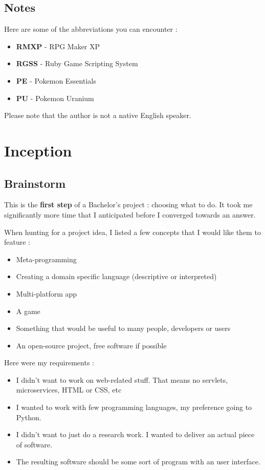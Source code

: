 \documentclass[11pt]{article}
\begin{document}
\subsection{Notes}

Here are some of the abbreviations you can encounter :
\begin{itemize}
	\item \textbf{RMXP} - RPG Maker XP
	\item \textbf{RGSS} - Ruby Game Scripting System
	\item \textbf{PE} - Pokemon Essentials
	\item \textbf{PU} - Pokemon Uranium
\end{itemize}

Please note that the author is not a native English speaker.


\newpage
\section{Inception}
\subsection{Brainstorm}

This is the \textbf{first step} of a Bachelor's project : choosing what to do. It took me significantly more time that I anticipated before I converged towards an answer.

When hunting for a project idea, I listed a few concepts that I would like them to feature :
\begin{itemize}
	\item Meta-programming
	\item Creating a domain specific language (descriptive or interpreted)
	\item Multi-platform app
	\item A game
	\item Something that would be useful to many people, developers or users
	\item An open-source project, free software if possible
\end{itemize}

Here were my requirements :
\begin{itemize}
	\item I didn't want to work on web-related stuff. That means no servlets, microservices, HTML or CSS, etc
	
	\item I wanted to work with few programming languages, my preference going to Python.
	
	\item I didn't want to just do a research work. I wanted to deliver an actual piece of software.
	
	\item The resulting software should be some sort of program with an user interface.
\end{itemize}
\end{document}

